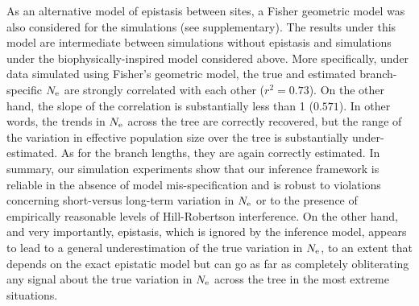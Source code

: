 \documentclass{article}
\begin{document}
    As an alternative model of epistasis between sites, a Fisher geometric model was also considered for the simulations (see supplementary).
    The results under this model are intermediate between simulations without epistasis and simulations under the biophysically-inspired model considered above.
    More specifically, under data simulated using Fisher’s geometric model, the true and estimated branch-specific $N_{\text{e}}$ are strongly correlated with each other ($r^2 = 0.73$).
    On the other hand, the slope of the correlation is substantially less than 1 ($0.571$).
    In other words, the trends in $N_{\text{e}}$ across the tree are correctly recovered, but the range of the variation in {effective population size} over the tree is substantially under-estimated.
    As for the branch lengths, they are again correctly estimated.
    In summary, our simulation experiments show that our inference framework is reliable in the absence of model mis-specification and is robust to violations concerning short-versus long-term variation in $N_{\text{e}}$ or to the presence of empirically reasonable levels of Hill-Robertson interference.
    On the other hand, and very importantly, epistasis, which is ignored by the inference model, appears to lead to a general underestimation of the true variation in $N_{\text{e}}$, to an extent that depends on the exact epistatic model but can go as far as completely obliterating any signal about the true variation in $N_{\text{e}}$ across the tree in the most extreme situations.
\end{document}
